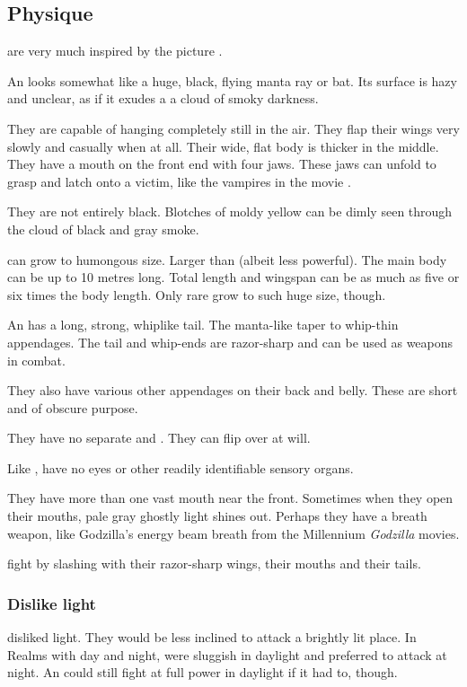 \subsection{Physique}
\Umbrae are very much inspired by the picture \cite{Picture:GunnerRomantic:BermudaTaowls}. 

An \umbra{} looks somewhat like a huge, black, flying manta ray or bat. 
Its surface is hazy and unclear, as if it exudes a a cloud of smoky darkness. 

They are capable of hanging completely still in the air.
They flap their wings very slowly and casually when at all. 
Their wide, flat body is thicker in the middle. 
They have a mouth on the front end with four jaws. 
These jaws can unfold to grasp and latch onto a victim, like the vampires in the movie \cite{Movie:BladeII}. 

They are not entirely black. 
Blotches of moldy yellow can be dimly seen through the cloud of black and gray smoke. 

\Umbrae can grow to humongous size.
Larger than \dragons (albeit less powerful). 
The main body can be up to 10 metres long. 
Total length and wingspan can be as much as five or six times the body length. 
Only rare \umbrae grow to such huge size, though. 

An \umbra{} has a long, strong, whiplike tail. 
The manta-like taper to whip-thin appendages. 
The tail and whip-ends are razor-sharp and can be used as weapons in combat. 

They also have various other appendages on their back and belly. 
These are short and of obscure purpose. 

They have no separate  and . 
They can flip over at will. 

Like \banes, \umbrae{} have no eyes or other readily identifiable sensory organs. 

They have more than one vast mouth near the front. 
Sometimes when they open their mouths, pale gray ghostly light shines out.
Perhaps they have a breath weapon, like Godzilla's energy beam breath from the Millennium \emph{Godzilla} movies. 

\Umbrae{} fight by slashing with their razor-sharp wings, their mouths and their tails. 





\subsubsection{Dislike light}
\Umbrae disliked light. 
They would be less inclined to attack a brightly lit place. 
In Realms with day and night, \umbrae were sluggish in daylight and preferred to attack at night. 
An \umbra could still fight at full power in daylight if it had to, though. 





